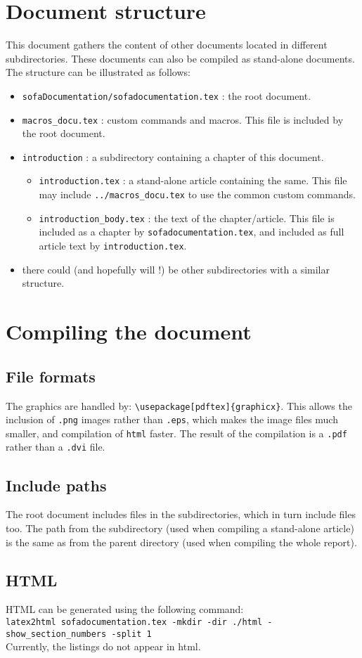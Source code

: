 \documentclass[a4paper,10pt]{report}
\begin{document}
\section{Document structure}
This document gathers the content of other documents located in different subdirectories. These documents can also be compiled as stand-alone documents.
The structure can be illustrated as follows:
\begin{itemize}
 \item \texttt{sofaDocumentation/sofadocumentation.tex} : the root document.
 \item \texttt{macros\_docu.tex} : custom commands and macros. This file is included by the root document.
 \item \texttt{introduction} : a subdirectory containing a chapter of this document.
\begin{itemize}
 \item \texttt{introduction.tex} : a stand-alone article containing the same. This file may include \texttt{../macros\_docu.tex} to use the common custom commands.
 \item \texttt{introduction\_body.tex} : the text of the chapter/article. This file is included as a chapter by \texttt{sofadocumentation.tex}, and included as full article text by \texttt{introduction.tex}.
\end{itemize}
 \item there could (and hopefully will !) be other subdirectories with a similar structure.
\end{itemize}

\section{Compiling the document}
\subsection{File formats}
The graphics are handled by: \texttt{\textbackslash usepackage[pdftex]\{graphicx\}}. This allows the inclusion of \texttt{.png} images rather than \texttt{.eps}, which makes the image files much smaller, and compilation of \texttt{html} faster. The result of the compilation is a \texttt{.pdf} rather than a \texttt{.dvi} file.

\subsection{Include paths}
The root document includes files in the subdirectories, which in turn include files too. The path from the subdirectory (used when compiling a stand-alone article) is the same as from the parent directory (used when compiling the whole report).

\subsection{HTML}
HTML can be generated using the following command:\\
\texttt{latex2html sofadocumentation.tex -mkdir -dir ./html -show\_section\_numbers -split 1}
\\
Currently, the listings do not appear in html.
\end{document}
